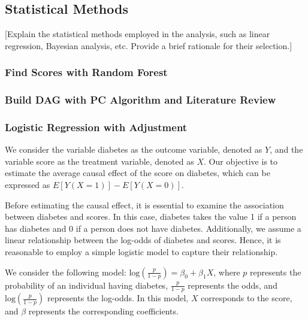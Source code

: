 \documentclass[
  12pt,
]{article}
\begin{document}
\hypertarget{statistical-methods}{%
\subsection{Statistical Methods}\label{statistical-methods}}

{[}Explain the statistical methods employed in the analysis, such as
linear regression, Bayesian analysis, etc. Provide a brief rationale for
their selection.{]}

\hypertarget{find-scores-with-random-forest}{%
\subsubsection{Find Scores with Random
Forest}\label{find-scores-with-random-forest}}

\hypertarget{build-dag-with-pc-algorithm-and-literature-review}{%
\subsubsection{Build DAG with PC Algorithm and Literature
Review}\label{build-dag-with-pc-algorithm-and-literature-review}}

\hypertarget{logistic-regression-with-adjustment}{%
\subsubsection{Logistic Regression with
Adjustment}\label{logistic-regression-with-adjustment}}

We consider the variable diabetes as the outcome variable, denoted as
\(Y\), and the variable score as the treatment variable, denoted as
\(X\). Our objective is to estimate the average causal effect of the
score on diabetes, which can be expressed as \(E[Y(X=1)] - E[Y(X=0)]\).

Before estimating the causal effect, it is essential to examine the
association between diabetes and scores. In this case, diabetes takes
the value 1 if a person has diabetes and 0 if a person does not have
diabetes. Additionally, we assume a linear relationship between the
log-odds of diabetes and scores. Hence, it is reasonable to employ a
simple logistic model to capture their relationship.

We consider the following model:
\(\text{log}(\frac{p}{1-p}) = \beta_0 + \beta_1 X\), where \(p\)
represents the probability of an individual having diabetes,
\(\frac{p}{1-p}\) represents the odds, and \(\text{log}(\frac{p}{1-p})\)
represents the log-odds. In this model, \(X\) corresponds to the score,
and \(\beta\) represents the corresponding coefficients.
\end{document}
